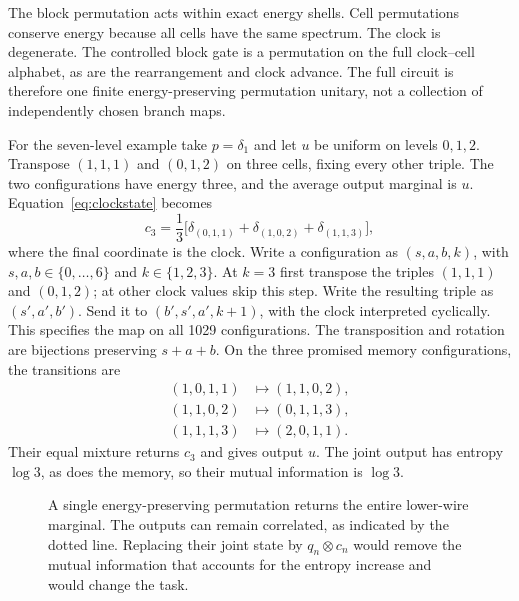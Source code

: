 The block permutation acts within exact energy shells. Cell permutations conserve energy because all cells have the same spectrum. The clock is degenerate. The controlled block gate is a permutation on the full clock--cell alphabet, as are the rearrangement and clock advance. The full circuit is therefore one finite energy-preserving permutation unitary, not a collection of independently chosen branch maps.

For the seven-level example take $p=\delta_1$ and let $u$ be uniform on levels $0,1,2$. Transpose $(1,1,1)$ and $(0,1,2)$ on three cells, fixing every other triple. The two configurations have energy three, and the average output marginal is $u$. Equation~\eqref{eq:clockstate} becomes
\begin{equation}
 c_3=\frac13\bigl[\delta_{(0,1,1)}+\delta_{(1,0,2)}+\delta_{(1,1,3)}\bigr], \label{eq:c3}
\end{equation}
where the final coordinate is the clock. Write a configuration as $(s,a,b,k)$, with $s,a,b\in\{0,\ldots,6\}$ and $k\in\{1,2,3\}$. At $k=3$ first transpose the triples $(1,1,1)$ and $(0,1,2)$; at other clock values skip this step. Write the resulting triple as $(s',a',b')$. Send it to $(b',s',a',k+1)$, with the clock interpreted cyclically. This specifies the map on all 1029 configurations. The transposition and rotation are bijections preserving $s+a+b$. On the three promised memory configurations, the transitions are
\begin{align*}
 (1,0,1,1)&\longmapsto(1,1,0,2),\\
 (1,1,0,2)&\longmapsto(0,1,1,3),\\
 (1,1,1,3)&\longmapsto(2,0,1,1).
\end{align*}
Their equal mixture returns $c_3$ and gives output $u$. The joint output has entropy $\log3$, as does the memory, so their mutual information is $\log3$.

\begin{figure}[tb]
\centering
{}
\caption{A single energy-preserving permutation returns the entire lower-wire marginal. The outputs can remain correlated, as indicated by the dotted line. Replacing their joint state by $q_n\otimes c_n$ would remove the mutual information that accounts for the entropy increase and would change the task.}
\label{fig:clock}
\end{figure}

